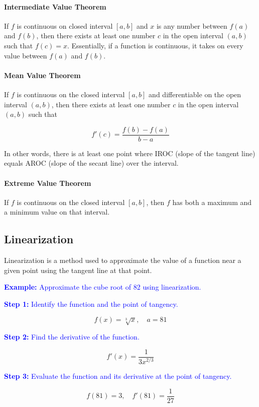 \documentclass[letterpaper, 12pt]{article}
\newcommand{\example}[1]{\textcolor{blue}{\textbf{Example:} #1}}
\newcommand{\step}[2]{\textcolor{blue}{\textbf{Step #1:} #2}}
\begin{document}
\paragraph{Intermediate Value Theorem} If $f$ is continuous on closed interval $[a, b]$ and $x$ is any number between $f(a)$ and $f(b)$, then there exists at least one number $c$ in the open interval $(a, b)$ such that $f(c) = x$. Essentially, if a function is continuous, it takes on every value between $f(a)$ and $f(b)$.

\paragraph{Mean Value Theorem} If $f$ is continuous on the closed interval $[a, b]$ and differentiable on the open interval $(a, b)$, then there exists at least one number $c$ in the open interval $(a, b)$ such that

\[f'(c) = \frac{f(b) - f(a)}{b - a}\]

In other words, there is at least one point where IROC (slope of the tangent line) equals AROC (slope of the secant line) over the interval.

\paragraph{Extreme Value Theorem} If $f$ is continuous on the closed interval $[a, b]$, then $f$ has both a maximum and a minimum value on that interval.

\subsection*{Linearization}

Linearization is a method used to approximate the value of a function near a given point using the tangent line at that point. 

\example{Approximate the cube root of 82 using linearization.}

\step{1}{Identify the function and the point of tangency.}

$$f(x) = \sqrt[3]{x}, \quad a = 81$$

\step{2}{Find the derivative of the function.}

$$f'(x) = \frac{1}{3x^{2/3}}$$

\step{3}{Evaluate the function and its derivative at the point of tangency.}

$$f(81) = 3, \quad f'(81) = \frac{1}{27}$$
\end{document}
